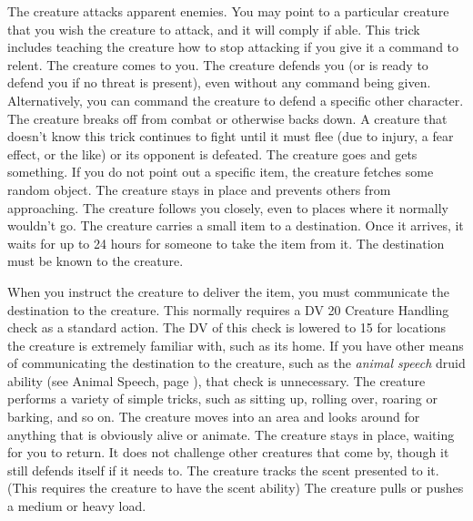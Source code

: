         The creature attacks apparent enemies. You may point to a particular creature that you wish the creature to attack, and it will comply if able. This trick includes teaching the creature how to stop attacking if you give it a command to relent.
         The creature comes to you.
         The creature defends you (or is ready to defend you if no threat is present), even without any command being given. Alternatively, you can command the creature to defend a specific other character.
         The creature breaks off from combat or otherwise backs down. A creature that doesn't know this trick continues to fight until it must flee (due to injury, a fear effect, or the like) or its opponent is defeated.
         The creature goes and gets something. If you do not point out a specific item, the creature fetches some random object.
         The creature stays in place and prevents others from approaching.
         The creature follows you closely, even to places where it normally wouldn't go.
         The creature carries a small item to a destination.
        Once it arrives, it waits for up to 24 hours for someone to take the item from it.
        The destination must be known to the creature.
        \par When you instruct the creature to deliver the item, you must communicate the destination to the creature.
        This normally requires a DV 20 Creature Handling check as a standard action.
        The DV of this check is lowered to 15 for locations the creature is extremely familiar with, such as its home.
        If you have other means of communicating the destination to the creature, such as the \textit{animal speech} druid ability (see Animal Speech, page ), that check is unnecessary.
         The creature performs a variety of simple tricks, such as sitting up, rolling over, roaring or barking, and so on.
         The creature moves into an area and looks around for anything that is obviously alive or animate.
         The creature stays in place, waiting for you to return. It does not challenge other creatures that come by, though it still defends itself if it needs to.
         The creature tracks the scent presented to it. (This requires the creature to have the scent ability)
         The creature pulls or pushes a medium or heavy load.

